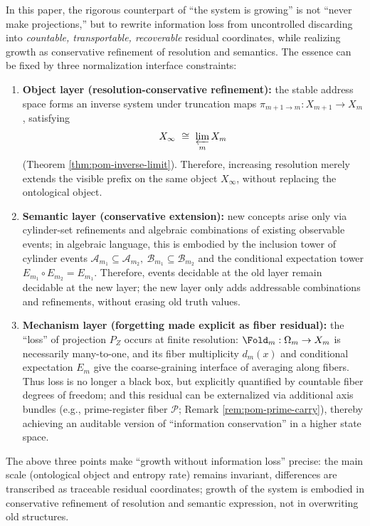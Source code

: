 \begin{remark}\label{rem:pom-growth-no-loss}
In this paper, the rigorous counterpart of ``the system is growing'' is not ``never make projections,'' but to rewrite information loss from uncontrolled discarding into \emph{countable, transportable, recoverable} residual coordinates, while realizing growth as conservative refinement of resolution and semantics. The essence can be fixed by three normalization interface constraints:
\begin{enumerate}
  \item \textbf{Object layer (resolution-conservative refinement):} the stable address space forms an inverse system under truncation maps \(\pi_{m+1\to m}:X_{m+1}\to X_m\), satisfying
  \[
  X_\infty\ \cong\ \varprojlim_m X_m
  \]
  (Theorem \ref{thm:pom-inverse-limit}). Therefore, increasing resolution merely extends the visible prefix on the same object \(X_\infty\), without replacing the ontological object.
  \item \textbf{Semantic layer (conservative extension):} new concepts arise only via cylinder-set refinements and algebraic combinations of existing observable events; in algebraic language, this is embodied by the inclusion tower of cylinder events
  \(
  \mathcal{A}_{m_1}\subseteq\mathcal{A}_{m_2},\
  \mathcal{B}_{m_1}\subseteq\mathcal{B}_{m_2}
  \)
  and the conditional expectation tower \(E_{m_1}\circ E_{m_2}=E_{m_1}\). Therefore, events decidable at the old layer remain decidable at the new layer; the new layer only adds addressable combinations and refinements, without erasing old truth values.
  \item \textbf{Mechanism layer (forgetting made explicit as fiber residual):} the ``loss'' of projection \(P_Z\) occurs at finite resolution: \(\Fold_m:\Omega_m\to X_m\) is necessarily many-to-one, and its fiber multiplicity \(d_m(x)\) and conditional expectation \(E_m\) give the coarse-graining interface of averaging along fibers. Thus loss is no longer a black box, but explicitly quantified by countable fiber degrees of freedom; and this residual can be externalized via additional axis bundles (e.g., prime-register fiber \(\mathcal{P}\); Remark \ref{rem:pom-prime-carry}), thereby achieving an auditable version of ``information conservation'' in a higher state space.
\end{enumerate}
The above three points make ``growth without information loss'' precise: the main scale (ontological object and entropy rate) remains invariant, differences are transcribed as traceable residual coordinates; growth of the system is embodied in conservative refinement of resolution and semantic expression, not in overwriting old structures.

\end{remark}